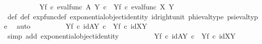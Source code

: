 \begin{isabellebody}
\ \ \ \ \ \ \ \ \ \ {\isacharparenleft}{\kern0pt}{\isasympsi}\isactrlbsup Y\isactrlesup \isactrlsub f\ {\isasymcirc}\isactrlsub c\ {\isacharparenleft}{\kern0pt}eval{\isacharunderscore}{\kern0pt}func\ A\ Y{\isacharparenright}{\kern0pt}\isactrlsup {\isasymsharp}{\isacharparenright}{\kern0pt}\ {\isasymcirc}\isactrlsub c\ \ {\isacharparenleft}{\kern0pt}{\isasymphi}\isactrlbsup Y\isactrlesup \isactrlsub f\ {\isasymcirc}\isactrlsub c\ {\isacharparenleft}{\kern0pt}eval{\isacharunderscore}{\kern0pt}func\ X\ Y{\isacharparenright}{\kern0pt}\isactrlsup {\isasymsharp}{\isacharparenright}{\kern0pt}{\isachardoublequoteclose}\isanewline
\ \ \ \ \ \ \isamarkupfalse%
\ {\isasymphi}{\isacharunderscore}{\kern0pt}def\ {\isasympsi}{\isacharunderscore}{\kern0pt}def\ exp{\isacharunderscore}{\kern0pt}func{\isacharunderscore}{\kern0pt}def{}\ exponential{\isacharunderscore}{\kern0pt}object{\isacharunderscore}{\kern0pt}identity\ id{\isacharunderscore}{\kern0pt}right{\isacharunderscore}{\kern0pt}unit{}\ phi{\isacharunderscore}{\kern0pt}eval{\isacharunderscore}{\kern0pt}type\ psi{\isacharunderscore}{\kern0pt}eval{\isacharunderscore}{\kern0pt}type\ \isamarkupfalse%
\ auto\isanewline
\ \ \ \ \isamarkupfalse%
\ \isamarkupfalse%
\ {\isachardoublequoteopen}{\isachardot}{\kern0pt}{\isachardot}{\kern0pt}{\isachardot}{\kern0pt}\ {\isacharequal}{\kern0pt}\ {\isacharparenleft}{\kern0pt}{\isasympsi}\isactrlbsup Y\isactrlesup \isactrlsub f\ {\isasymcirc}\isactrlsub c\ id{\isacharparenleft}{\kern0pt}A\isactrlbsup Y\isactrlesup {\isacharparenright}{\kern0pt}{\isacharparenright}{\kern0pt}\ {\isasymcirc}\isactrlsub c\ \ {\isacharparenleft}{\kern0pt}{\isasymphi}\isactrlbsup Y\isactrlesup \isactrlsub f\ {\isasymcirc}\isactrlsub c\ id{\isacharparenleft}{\kern0pt}X\isactrlbsup Y\isactrlesup {\isacharparenright}{\kern0pt}{\isacharparenright}{\kern0pt}{\isachardoublequoteclose}\isanewline
\ \ \ \ \ \ \isamarkupfalse%
\ {\isacharparenleft}{\kern0pt}simp\ add{\isacharcolon}{\kern0pt}\ exponential{\isacharunderscore}{\kern0pt}object{\isacharunderscore}{\kern0pt}identity{\isacharparenright}{\kern0pt}\isanewline
\ \ \ \ \isamarkupfalse%
\ \isamarkupfalse%
\ {\isachardoublequoteopen}{\isachardot}{\kern0pt}{\isachardot}{\kern0pt}{\isachardot}{\kern0pt}\ {\isacharequal}{\kern0pt}\ {\isasympsi}\isactrlbsup Y\isactrlesup \isactrlsub f\ {\isasymcirc}\isactrlsub c\ {\isacharparenleft}{\kern0pt}id{\isacharparenleft}{\kern0pt}A\isactrlbsup Y\isactrlesup {\isacharparenright}{\kern0pt}\ {\isasymcirc}\isactrlsub c\ \ {\isacharparenleft}{\kern0pt}{\isasymphi}\isactrlbsup Y\isactrlesup \isactrlsub f\ {\isasymcirc}\isactrlsub c\ id{\isacharparenleft}{\kern0pt}X\isactrlbsup Y\isactrlesup {\isacharparenright}{\kern0pt}{\isacharparenright}{\kern0pt}{\isacharparenright}{\kern0pt}{\isachardoublequoteclose}\ \isanewline

\end{isabellebody}
